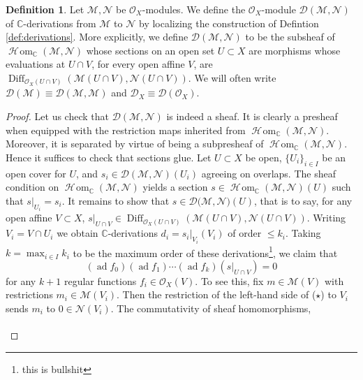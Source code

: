 \documentclass{article}
\newcommand{\C}{\mathbb{C}}
\theoremstyle{plain}
\theoremstyle{definition}
\newtheorem{definition}[theorem]{Definition}
\theoremstyle{remark}
\DeclareMathOperator{\sHom}{\mathscr{H}\!om}
\DeclareMathOperator{\Diff}{Diff}
\DeclareMathOperator{\ad}{ad}
\begin{document}
\begin{definition}
    Let $\mathcal{M},\mathcal{N}$ be $\mathcal{O}_X$-modules. We define the $\mathcal{O}_X$-module $\mathcal{D}(\mathcal{M},\mathcal{N})$ of $\C$-derivations
    from $\mathcal{M}$ to $\mathcal{N}$ by localizing the construction of Defintion \ref{def:derivations}.
    More explicitly, we define $\mathcal{D}(\mathcal{M},\mathcal{N})$ to be the subsheaf of $\sHom_\C(\mathcal{M},\mathcal{N})$
    whose sections on an open set $U\subset X$ are morphisms whose evaluations at $U\cap V$, for every
    open affine $V$, are $\Diff_{\mathcal{O}_X(U\cap V)}(\mathcal{M}(U\cap V),\mathcal{N}(U\cap V))$.
    We will often write $\mathcal{D}(\mathcal{M})\equiv\mathcal{D}(\mathcal{M,M})$ and $\mathcal{D}_X\equiv\mathcal{D}(\mathcal{O}_X)$.
\end{definition}
\begin{proof}
    Let us check that $\mathcal{D}(\mathcal{M},\mathcal{N})$ is indeed a sheaf. It is clearly
    a presheaf when equipped with the restriction maps inherited from $\sHom_\C(\mathcal{M},\mathcal{N})$.
    Moreover, it is separated by virtue of being a subpresheaf of $\sHom_\C(\mathcal{M},\mathcal{N})$.
    Hence it suffices to check that sections glue. Let $U\subset X$ be open, $\{U_i\}_{i\in I}$ be
    an open cover for $U$, and $s_i\in\mathcal{D}(\mathcal{M},\mathcal{N})(U_i)$ agreeing on
    overlaps. The sheaf condition
    on $\sHom_\C(\mathcal{M},\mathcal{N})$ yields a section $s\in\sHom_\C(\mathcal{M},\mathcal{N})(U)$
    such that $s|_{U_i}=s_i$. It remains to show that $s\in\mathcal{D}(\mathcal{M},\mathcal{N)}(U)$, that is
    to say, for any open affine $V\subset X$, $s|_{U\cap V}\in\Diff_{\mathcal{O}_X(U\cap V)}(\mathcal{M}(U\cap V),\mathcal{N}(U\cap V))$.
    Writing $V_i=V\cap U_i$ we obtain $\C$-derivations $d_i=s_i|_{V_i}(V_i)$ of order $\leqslant k_i$. Taking
    $k=\max_{i\in I} k_i$ to be the maximum order of these derivations\footnote{this is bullshit}, we claim that
    \begin{equation*}
        (\ad f_0)(\ad f_1)\cdots(\ad f_k)(s|_{U\cap V})=0\tag{$\star$}
    \end{equation*}
    for any $k+1$ regular functions $f_i\in\mathcal{O}_X(V)$. To see this, fix $m\in\mathcal{M}(V)$
    with restrictions $m_i\in\mathcal{M}(V_i)$. Then the restriction of the left-hand side of ($\star$)
    to $V_i$ sends $m_i$ to $0\in\mathcal{N}(V_i)$. The commutativity of sheaf homomorphisms,
    \begin{equation*}
        \begin{tikzcd}

\end{tikzcd}
\end{equation*}
\end{proof}
\end{document}

